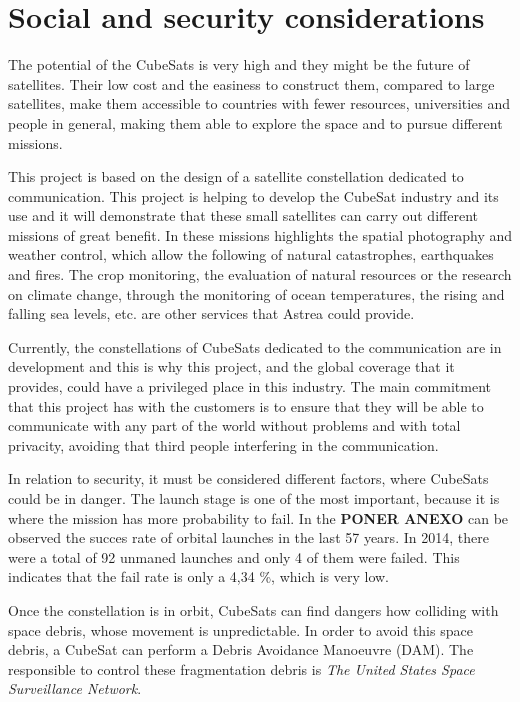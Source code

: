 \chapter{Social and security considerations}

The potential of the CubeSats is very high and they might be the future of satellites. Their low cost and the easiness to construct them, compared to large satellites, make them accessible to countries with fewer resources, universities and people in general, making them able to explore the space and to pursue different missions.

This project is based on the design of a satellite constellation dedicated to communication. This project is helping to develop the CubeSat industry and its use and it will demonstrate that these small satellites can carry out different missions of great benefit. In these missions highlights the spatial photography and weather control, which allow the following of natural catastrophes, earthquakes and fires. The crop monitoring, the evaluation of natural resources or the research on climate change, through the monitoring of ocean temperatures, the rising and falling sea levels, etc. are other services that Astrea could provide. 

Currently, the constellations of CubeSats dedicated to the communication are in development and this is why this project, and the global coverage that it provides, could have a privileged place in this industry. The main commitment that this project has with the customers is to ensure that they will be able to communicate with any part of the world without problems and with total privacity, avoiding that third people interfering in the communication.

In relation to security, it must be considered different factors, where CubeSats could be in danger. The launch stage is one of the most important, because it is where the mission has more probability to fail. In the \textbf{PONER ANEXO} can be observed the succes rate of orbital launches in the last 57 years. In 2014, there were a total of 92 unmaned launches and only 4 of them were failed. This indicates that the fail rate is only a 4,34 \%, which is very low. 

Once the constellation is in orbit, CubeSats can find dangers how colliding with space debris, whose movement is unpredictable. In order to avoid this space debris, a CubeSat can perform a Debris Avoidance Manoeuvre (DAM). The responsible to control these fragmentation debris is \textit{The United States Space Surveillance Network}.
